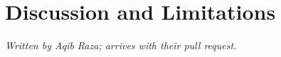 \section{Discussion and Limitations}
\label{sec:discussion}

\emph{Written by Aqib Raza; arrives with their pull request.}
